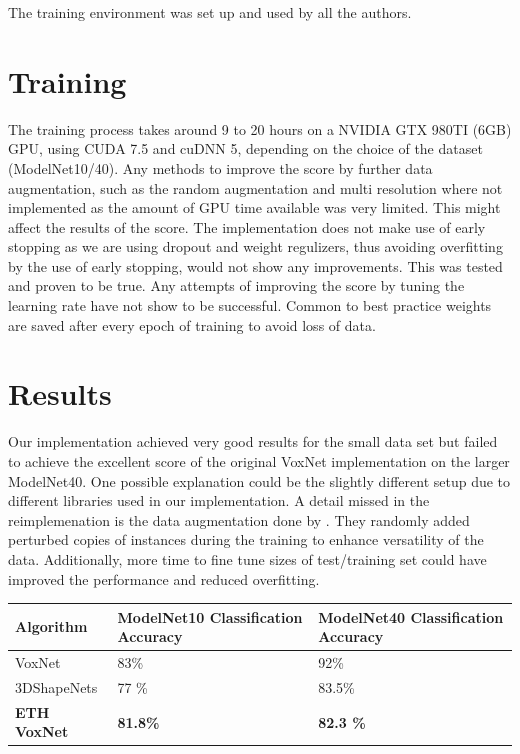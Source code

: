 \documentclass[10pt,twocolumn,letterpaper]{article}
\begin{document}
The training environment was set up and used by all the authors. 

 
\section{Training}

The training process takes around 9 to 20 hours on a NVIDIA GTX 980TI (6GB) GPU, using CUDA 7.5 and cuDNN 5, 
depending on the choice of the dataset (ModelNet10/40). Any methods to improve the score by further data augmentation,
such as the random augmentation and multi resolution where not implemented as the amount of GPU time available
was very limited. This might affect the results of the score. 
The implementation does not make use of early stopping as we are using dropout and weight regulizers,
thus avoiding overfitting by the use of early stopping, would not show any improvements.
This was tested and proven to be true. Any attempts of improving the score by tuning the learning rate have not show to be successful.
Common to best practice weights are saved after every epoch of training to avoid loss of data.

\section{Results}

Our implementation achieved very good results for the small data set but failed to achieve the excellent score of the 
original VoxNet implementation on the larger ModelNet40. One possible explanation could be the slightly different setup due 
to different libraries used in our implementation. 
A detail missed in the reimplemenation is the data augmentation done by \cite{voxnet}. 
They randomly added perturbed copies of instances during the training to enhance versatility of the data.
Additionally, more time to fine tune sizes of test/training set could have improved the performance and reduced overfitting.

\begin{center}
\begin{tabular}{ |p{2.3cm}||p{2.3cm}|p{2.3cm}|  }
 \hline
 Algorithm & ModelNet10 Classification Accuracy  & ModelNet40 Classification Accuracy \\
 \hline
 VoxNet \cite{voxnet}   & 83\% & 92\% \\
 3DShapeNets  \cite{shape}   & 77 \% & 83.5\% \\
\textbf{ETH VoxNet}    & \textbf{81.8\%}   & \textbf{82.3 \%}  \\
 \hline
\end{tabular}
\end{center}
\end{document}
